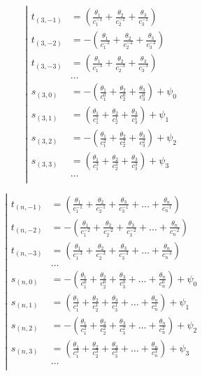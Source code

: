 \begin{equation*} \left| \begin{aligned}
t_{(3,-1)} &=
  \left(
  \frac{\theta_1}{c_1^{-1}}
+ \frac{\theta_2}{c_2^{-1}}
+ \frac{\theta_3}{c_3^{-1}} \right) \\
%
t_{(3,-2)} &=
- \left(
  \frac{\theta_1}{c_1^{-2}}
+ \frac{\theta_2}{c_2^{-2}}
+ \frac{\theta_3}{c_3^{-2}} \right) \\
%
t_{(3,-3)} &=
  \left(
  \frac{\theta_1}{c_1^{-3}}
+ \frac{\theta_2}{c_2^{-3}}
+ \frac{\theta_3}{c_3^{-3}} \right) \\
%
&\ldots \\
%
s_{(3,0)} &=
- \left(
  \frac{\theta_1}{c_1^0}
+ \frac{\theta_2}{c_2^0}
+ \frac{\theta_3}{c_3^0} \right)
+ \psi_0 \\
%
s_{(3,1)} &=
  \left(
  \frac{\theta_1}{c_1^1}
+ \frac{\theta_2}{c_2^1}
+ \frac{\theta_3}{c_3^1} \right)
+ \psi_1 \\
%
s_{(3,2)} &=
- \left(
  \frac{\theta_1}{c_1^2}
+ \frac{\theta_2}{c_2^2}
+ \frac{\theta_3}{c_3^2} \right)
+ \psi_2 \\
%
s_{(3,3)} &=
  \left(
  \frac{\theta_1}{c_1^3}
+ \frac{\theta_2}{c_2^3}
+ \frac{\theta_3}{c_3^3} \right)
+ \psi_3 \\
%
&\ldots \\
\end{aligned} \right. \end{equation*}

\begin{equation*} \left| \begin{aligned}
t_{(n,-1)} &=
  \left(
  \frac{\theta_1}{c_1^{-1}}
+ \frac{\theta_2}{c_2^{-1}}
+ \frac{\theta_3}{c_3^{-1}}
+ \ldots
+ \frac{\theta_n}{c_n^{-1}} \right) \\
%
t_{(n,-2)} &=
- \left(
  \frac{\theta_1}{c_1^{-2}}
+ \frac{\theta_2}{c_2^{-2}}
+ \frac{\theta_3}{c_3^{-2}}
+ \ldots
+ \frac{\theta_n}{c_n^{-2}} \right) \\
%
t_{(n,-3)} &=
  \left(
  \frac{\theta_1}{c_1^{-3}}
+ \frac{\theta_2}{c_2^{-3}}
+ \frac{\theta_3}{c_3^{-3}}
+ \ldots
+ \frac{\theta_n}{c_n^{-3}} \right) \\
%
&\ldots \\
%
s_{(n,0)} &=
- \left(
  \frac{\theta_1}{c_1^0}
+ \frac{\theta_2}{c_2^0}
+ \frac{\theta_3}{c_3^0}
+ \ldots
+ \frac{\theta_n}{c_n^0} \right)
+ \psi_0 \\
%
s_{(n,1)} &=
  \left(
  \frac{\theta_1}{c_1^1}
+ \frac{\theta_2}{c_2^1}
+ \frac{\theta_3}{c_3^1}
+ \ldots
+ \frac{\theta_n}{c_n^1} \right)
+ \psi_1 \\
%
s_{(n,2)} &=
- \left(
  \frac{\theta_1}{c_1^2}
+ \frac{\theta_2}{c_2^2}
+ \frac{\theta_3}{c_3^2}
+ \ldots
+ \frac{\theta_n}{c_n^2} \right)
+ \psi_2 \\
%
s_{(n,3)} &=
  \left(
  \frac{\theta_1}{c_1^3}
+ \frac{\theta_2}{c_2^3}
+ \frac{\theta_3}{c_3^3}
+ \ldots
+ \frac{\theta_n}{c_n^3} \right)
+ \psi_3 \\
%
&\ldots \\
\end{aligned} \right. \end{equation*}